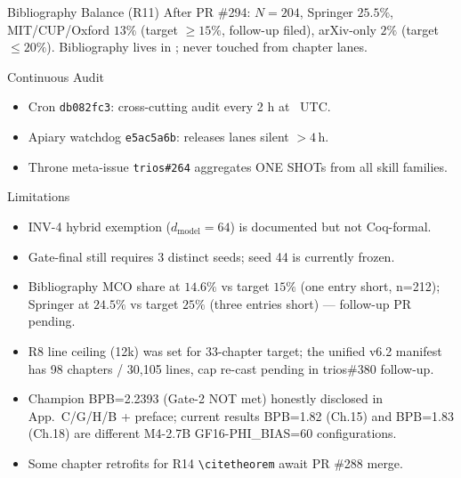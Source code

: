 \documentclass[10pt,aspectratio=169]{beamer}
\begin{document}
\begin{frame}{Bibliography Balance (R11)}
  After PR \#294: $N=204$, Springer $25{.}5\%$, MIT/CUP/Oxford $13\%$ (target $\geq 15\%$, follow-up filed),
  arXiv-only $2\%$ (target $\leq 20\%$).
  Bibliography lives in ; never touched from chapter lanes.
\end{frame}

\begin{frame}{Continuous Audit}
  \begin{itemize}
    \item Cron \texttt{db082fc3}: cross-cutting audit every 2 h at ~UTC.
    \item Apiary watchdog \texttt{e5ac5a6b}: releases lanes silent $>4$\,h.
    \item Throne meta-issue \texttt{trios\#264} aggregates ONE SHOTs from all skill families.
  \end{itemize}
\end{frame}

\begin{frame}{Limitations}
  \begin{itemize}
    \item INV-4 hybrid exemption ($d_{\mathrm{model}}\!=\!64$) is documented but not Coq-formal.
    \item Gate-final still requires 3 distinct seeds; seed 44 is currently frozen.
    \item Bibliography MCO share at $14.6\%$ vs target $15\%$ (one entry short, n=212); Springer at $24.5\%$ vs target $25\%$ (three entries short) — follow-up PR pending.
    \item R8 line ceiling (12k) was set for 33-chapter target; the unified v6.2 manifest has 98 chapters / 30,105 lines, cap re-cast pending in trios\#380 follow-up.
    \item Champion BPB=2.2393 (Gate-2 NOT met) honestly disclosed in App.~C/G/H/B + preface; current results BPB=1.82 (Ch.15) and BPB=1.83 (Ch.18) are different M4-2.7B GF16-PHI\_BIAS=60 configurations.
    \item Some chapter retrofits for R14 \texttt{\textbackslash citetheorem} await PR \#288 merge.
  \end{itemize}
\end{frame}
\end{document}
